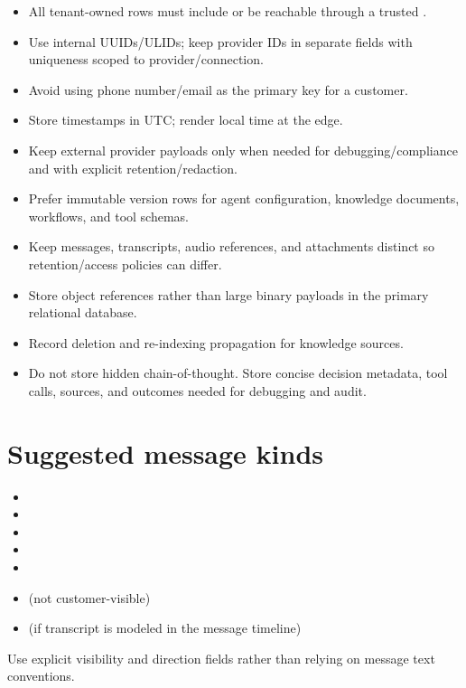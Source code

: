 \begin{itemize}
\item All tenant-owned rows must include or be reachable through a trusted .
\item Use internal UUIDs/ULIDs; keep provider IDs in separate fields with uniqueness scoped to provider/connection.
\item Avoid using phone number/email as the primary key for a customer.
\item Store timestamps in UTC; render local time at the edge.
\item Keep external provider payloads only when needed for debugging/compliance and with explicit retention/redaction.
\item Prefer immutable version rows for agent configuration, knowledge documents, workflows, and tool schemas.
\item Keep messages, transcripts, audio references, and attachments distinct so retention/access policies can differ.
\item Store object references rather than large binary payloads in the primary relational database.
\item Record deletion and re-indexing propagation for knowledge sources.
\item Do not store hidden chain-of-thought. Store concise decision metadata, tool calls, sources, and outcomes needed for debugging and audit.
\end{itemize}
\section{Suggested message kinds}

\begin{itemize}
\item {}
\item {}
\item {}
\item {}
\item {}
\item {} (not customer-visible)
\item {} (if transcript is modeled in the message timeline)
\end{itemize}
Use explicit visibility and direction fields rather than relying on message text conventions.

